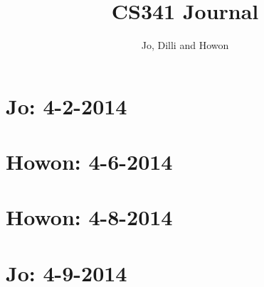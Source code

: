 


\author{Jo, Dilli and Howon}\title{CS341 Journal}\maketitle

\section*{Jo: 4-2-2014}


\section*{Howon: 4-6-2014}


\section*{Howon: 4-8-2014}


\section*{Jo: 4-9-2014}



